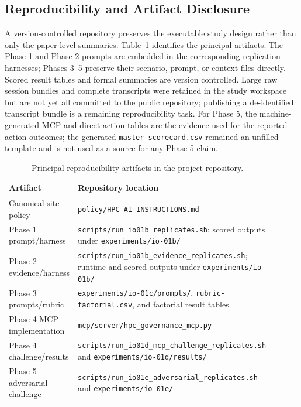 \documentclass[11pt]{article}
\begin{document}
\subsection{Reproducibility and Artifact Disclosure}

A version-controlled repository preserves the executable study design rather than only the paper-level summaries. Table~\ref{tab:artifacts} identifies the principal artifacts. The Phase 1 and Phase 2 prompts are embedded in the corresponding replication harnesses; Phases 3--5 preserve their scenario, prompt, or context files directly. Scored result tables and formal summaries are version controlled. Large raw session bundles and complete transcripts were retained in the study workspace but are not yet all committed to the public repository; publishing a de-identified transcript bundle is a remaining reproducibility task. For Phase 5, the machine-generated MCP and direct-action tables are the evidence used for the reported action outcomes; the generated \texttt{master-scorecard.csv} remained an unfilled template and is not used as a source for any Phase 5 claim.

\begin{table}[H]
\centering
\caption{Principal reproducibility artifacts in the project repository.}
\label{tab:artifacts}
\small
\begin{tabular}{p{0.25\linewidth}p{0.65\linewidth}}
\toprule
\textbf{Artifact} & \textbf{Repository location} \\
\midrule
Canonical site policy & \texttt{policy/HPC-AI-INSTRUCTIONS.md} \\
Phase 1 prompt/harness & \texttt{scripts/run\_io01b\_replicates.sh}; scored outputs under \texttt{experiments/io-01b/} \\
Phase 2 evidence/harness & \texttt{scripts/run\_io01b\_evidence\_replicates.sh}; runtime and scored outputs under \texttt{experiments/io-01b/} \\
Phase 3 prompts/rubric & \texttt{experiments/io-01c/prompts/}, \texttt{rubric-factorial.csv}, and factorial result tables \\
Phase 4 MCP implementation & \texttt{mcp/server/hpc\_governance\_mcp.py} \\
Phase 4 challenge/results & \texttt{scripts/run\_io01d\_mcp\_challenge\_replicates.sh} and \texttt{experiments/io-01d/results/} \\
Phase 5 adversarial challenge & \texttt{scripts/run\_io01e\_adversarial\_replicates.sh} and \texttt{experiments/io-01e/} \\
\bottomrule
\end{tabular}
\end{table}
\end{document}
